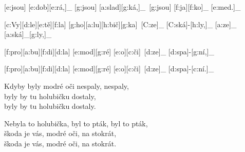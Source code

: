 [e:jsou] [e:dob][e:rá,]_ [g:jsou] [a:slad][g:ká,]_\
[g:jsou] [f:ja][f:ko]_ [e:med.]_\



[c:Vy][d:le][e:tě][f:la] [g:ho][a:lu][h:bič][g:ka]\
[C:ze]_ [C:ská]-[h:ly,]_ [a:ze]_ [a:ská]_[g:ly,]_\

[f:pro][a:bu][f:di][d:la] [e:mod][g:ré] [e:o][c:či]\
[d:ze]_ [d:spa]-[g:ní,]_\

[f:pro][a:bu][f:di][d:la] [e:mod][g:ré] [e:o][c:či]\
[d:ze]_ [d:spa]-[c:ní.]_\

Kdyby byly modré oči nespaly, nespaly,\\
byly by tu holubičku dostaly,\\
byly by tu holubičku dostaly.

Nebyla to holubička, byl to pták, byl to pták,\\
škoda je vás, modré oči, na stokrát,\\
škoda je vás, modré oči, na stokrát.

\bye
